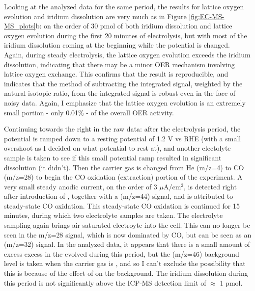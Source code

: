 Looking at the analyzed data for the same period, the results for lattice oxygen evolution and iridium dissolution are very much as in Figure \ref{fig:EC-MS-MS_plots}b: on the order of 30 pmol of both iridium dissolution and lattice oxygen evolution during the first 20 minutes of electrolysis, but with most of the iridium dissolution coming at the beginning while the potential is changed. Again, during steady electrolysis, the lattice oxygen evolution exceeds the iridium dissolution, indicating that there may be a minor OER mechanism involving lattice oxygen exchange. This confirms that the result is reproducible, and indicates that the method of subtracting the integrated  signal, weighted by the natural isotopic ratio, from the integrated  signal is robust even in the face of noisy data. Again, I emphasize that the lattice oxygen evolution is an extremely small portion - only 0.01\% - of the overall OER activity. 

Continuing towards the right in the raw data: after the electrolysis period, the potential is ramped down to a resting potential of 1.2 V vs RHE (with a small overshoot as I decided on what potential to rest at), and another electolyte sample is taken to see if this small potential ramp resulted in significant  dissolution (it didn't). Then the carrier gas is changed from He (m/z=4) to CO (m/z=28) to begin the CO oxidation (extraction) portion of the experiment. A very small steady anodic current, on the order of 3 $\mu$A/cm$^2$, is detected right after introduction of , together with a  (m/z=44) signal, and is attributed to steady-state CO oxidation. This steady-state CO oxidation is continued for 15 minutes, during which two electrolyte samples are taken. The electrolyte sampling again brings air-saturated electroyte into the cell. This can no longer be seen in the m/z=28 signal, which is now dominated by CO, but can be seen as an  (m/z=32) signal. In the analyzed data, it appears that there is a small amount of excess excess  in the  evolved during this period, but the  (m/z=46) background level is taken when the carrier gas is , and so I can't exclude the possibility that this is because of the effect of  on the background. The iridium dissolution during this period is not significantly above the ICP-MS detection limit of $\approx$ 1 pmol.

